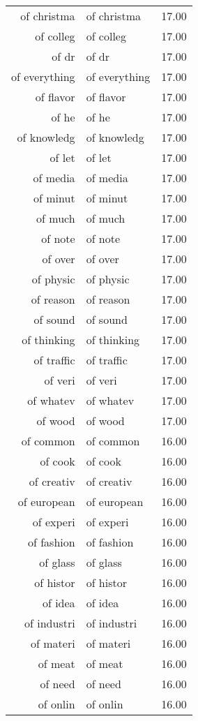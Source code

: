 \begin{table}[ht]
\begin{tabular}{rlr}
  of christma & of christma & 17.00 \\ 
  of colleg & of colleg & 17.00 \\ 
  of dr & of dr & 17.00 \\ 
  of everything & of everything & 17.00 \\ 
  of flavor & of flavor & 17.00 \\ 
  of he & of he & 17.00 \\ 
  of knowledg & of knowledg & 17.00 \\ 
  of let & of let & 17.00 \\ 
  of media & of media & 17.00 \\ 
  of minut & of minut & 17.00 \\ 
  of much & of much & 17.00 \\ 
  of note & of note & 17.00 \\ 
  of over & of over & 17.00 \\ 
  of physic & of physic & 17.00 \\ 
  of reason & of reason & 17.00 \\ 
  of sound & of sound & 17.00 \\ 
  of thinking & of thinking & 17.00 \\ 
  of traffic & of traffic & 17.00 \\ 
  of veri & of veri & 17.00 \\ 
  of whatev & of whatev & 17.00 \\ 
  of wood & of wood & 17.00 \\ 
  of common & of common & 16.00 \\ 
  of cook & of cook & 16.00 \\ 
  of creativ & of creativ & 16.00 \\ 
  of european & of european & 16.00 \\ 
  of experi & of experi & 16.00 \\ 
  of fashion & of fashion & 16.00 \\ 
  of glass & of glass & 16.00 \\ 
  of histor & of histor & 16.00 \\ 
  of idea & of idea & 16.00 \\ 
  of industri & of industri & 16.00 \\ 
  of materi & of materi & 16.00 \\ 
  of meat & of meat & 16.00 \\ 
  of need & of need & 16.00 \\ 
  of onlin & of onlin & 16.00 \\ 

\end{tabular}
\end{table}
